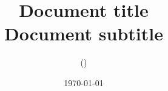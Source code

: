 \title{{\bf Document title} \\
Document subtitle}
\author{
\AuthorName (\AuthorEmail)\\
}
\date{\today}
\maketitle

\begin{abstract}

\end{abstract}

\tableofcontents
\clearpage
